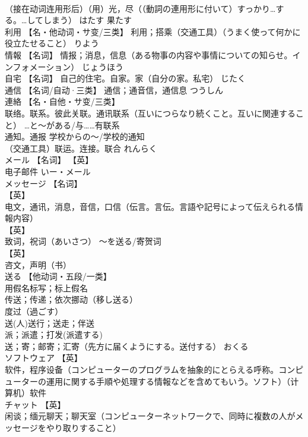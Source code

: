\documentclass[8pt]{extreport}
\begin{document}
\begin{CJK}{UTF8}{min}
\\	（接在动词连用形后）（用）光，尽（（動詞の連用形に付いて）すっかり…する。…してしまう）	はたす	果たす
\\	利用	【名・他动词・サ变/三类】 利用；搭乘（交通工具）（うまく使って何かに役立たせること）	りよう	
\\	情報	【名词】 情报；消息，信息（ある物事の内容や事情についての知らせ。インフォメーション）	じょうほう	
\\	自宅	【名词】 自己的住宅。自家。家（自分の家。私宅）	じたく	
\\	通信	【名词/自动·三类】 通信；通音信，通信息	つうしん	
\\	連絡	【名・自他・サ变/三类】 
\\	联络。联系。彼此关联。通讯联系（互いにつらなり続くこと。互いに関連すること） …と～がある/与……有联系 
\\	通知。通报 学校からの～/学校的通知 
\\	（交通工具）联运。连接。联合	れんらく	
\\	メール	【名词】 【英】
\\	电子邮件	いー・メール	
\\	メッセージ	【名词】 
\\	【英】
\\	电文，通讯，消息，音信，口信（伝言。言伝。言語や記号によって伝えられる情報内容） 
\\	【英】
\\	致词，祝词（あいさつ） 〜を送る/寄贺词 
\\	【英】
\\	咨文，声明（书）		
\\	送る	【他动词・五段/一类】 
\\	用假名标写；标上假名 
\\	传送；传递；依次挪动（移し送る） 
\\	度过（過ごす） 
\\	送(人)送行；送走；伴送 
\\	派；派遣；打发(派遣する) 
\\	送；寄；邮寄；汇寄（先方に届くようにする。送付する）	おくる	
\\	ソフトウェア	【英】
\\	软件，程序设备（コンピューターのプログラムを抽象的にとらえる呼称。コンピューターの運用に関する手順や処理する情報などを含めてもいう。ソフト）（计算机）软件		
\\	チャット	【英】
\\	闲谈；缅元聊天；聊天室（コンピューターネットワークで、同時に複数の人がメッセージをやり取りすること）		

\end{CJK}
\end{document}

